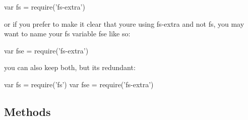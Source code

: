\begin{DoxyCode}
var fs = require(\textcolor{stringliteral}{'fs-extra'})
\end{DoxyCode}


or if you prefer to make it clear that you\textquotesingle{}re using {\ttfamily fs-\/extra} and not {\ttfamily fs}, you may want to name your {\ttfamily fs} variable {\ttfamily fse} like so\+:


\begin{DoxyCode}
var fse = require(\textcolor{stringliteral}{'fs-extra'})
\end{DoxyCode}


you can also keep both, but it\textquotesingle{}s redundant\+:


\begin{DoxyCode}
var fs = require(\textcolor{stringliteral}{'fs'})
var fse = require('fs-extra')
\end{DoxyCode}


\subsection*{Methods }


